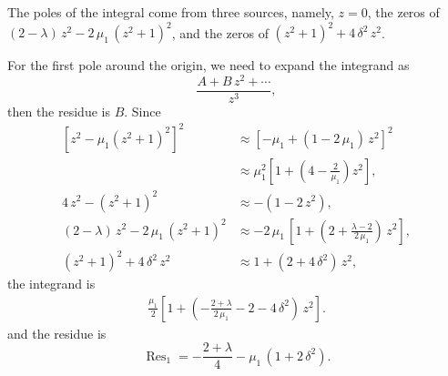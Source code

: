 \documentclass[reprint, floatfix]{revtex4-1}
\begin{document}
{The poles of the integral come from three sources,
namely,
$z = 0$,
the zeros of
$(2 - \lambda) \, z^2 - 2 \, \mu_1 \, (z^2 + 1)^2$,
and the zeros of
$( z^2 + 1 )^2 + 4 \, \delta^2 \, z^2$.

For the first pole around the origin,
we need to expand the integrand as
$$
\frac{ A + B \, z^2 + \cdots }
     {          z^3          },
$$
then the residue is $B$.
%
Since
$$
\begin{aligned}
\left[ z^2 - \mu_1 (z^2 + 1)^2 \right]^2
&
\approx
[ - \mu_1 + (1 - 2 \, \mu_1) \, z^2]^2
\\
&
\approx
\mu_1^2
\left[
  1 + \left(4 - \tfrac { 2  } { \mu_1 } \right) z^2
\right],
\\
%
4 \, z^2 - ( z^2 + 1 )^2
&
\approx
-( 1 - 2 \, z^2 ),
\\
%
(2 - \lambda) \, z^2 - 2 \, \mu_1 \, (z^2 + 1)^2
&
\approx
-2 \, \mu_1 \,
\left[
  1 + \left(
        2 + \tfrac{ \lambda - 2 } { 2 \, \mu_1 }
      \right)
      \, z^2
\right],
\\
%
( z^2 + 1 )^2 + 4 \, \delta^2 \, z^2
&
\approx
1 + (2 + 4 \, \delta^2) \, z^2,
\end{aligned}
$$
the integrand is
$$
\begin{aligned}
\frac{ \mu_1 }
     {   2   }
\left[
  1 + \left(
        - \frac{ 2 + \lambda } { 2 \, \mu_1 }
        - 2 - 4 \, \delta^2
      \right) \, z^2
\right].
\end{aligned}
$$
and the residue is
$$
\operatorname{Res}_1
=
  - \frac{ 2 + \lambda } { 4 }
  - \mu_1 \, \left( 1 + 2 \, \delta^2 \right).
$$


}
\end{document}
